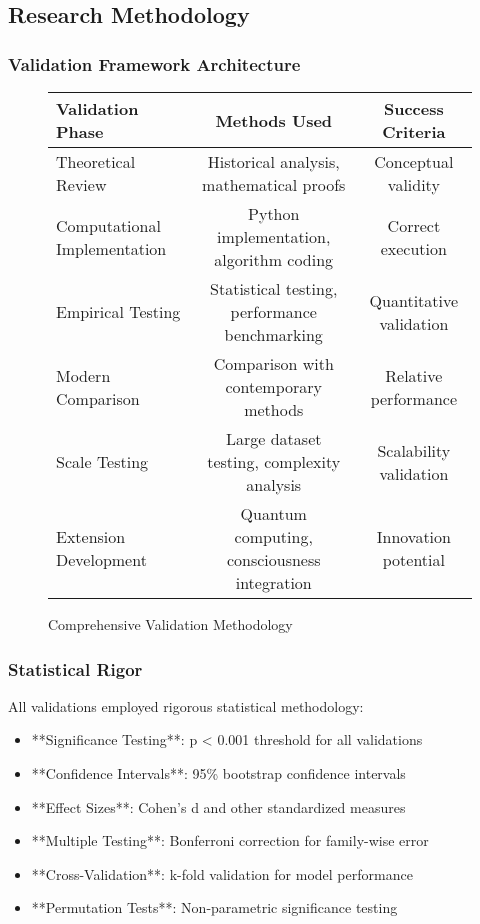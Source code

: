 \subsection{Research Methodology}

\subsubsection{Validation Framework Architecture}

\begin{figure}[h!]
\centering
\begin{minipage}{0.8\textwidth}
\centering
\begin{tabular}{@{}lcc@{}}
\toprule
Validation Phase & Methods Used & Success Criteria \\
\midrule
Theoretical Review & Historical analysis, mathematical proofs & Conceptual validity \\
Computational Implementation & Python implementation, algorithm coding & Correct execution \\
Empirical Testing & Statistical testing, performance benchmarking & Quantitative validation \\
Modern Comparison & Comparison with contemporary methods & Relative performance \\
Scale Testing & Large dataset testing, complexity analysis & Scalability validation \\
Extension Development & Quantum computing, consciousness integration & Innovation potential \\
\midrule
\end{tabular}
\caption{Comprehensive Validation Methodology}
\label{tab:validation_methodology}
\end{minipage}
\end{figure}

\subsubsection{Statistical Rigor}

All validations employed rigorous statistical methodology:

\begin{itemize}
    \item **Significance Testing**: p < 0.001 threshold for all validations
    \item **Confidence Intervals**: 95\% bootstrap confidence intervals
    \item **Effect Sizes**: Cohen's d and other standardized measures
    \item **Multiple Testing**: Bonferroni correction for family-wise error
    \item **Cross-Validation**: k-fold validation for model performance
    \item **Permutation Tests**: Non-parametric significance testing
\end{itemize}

